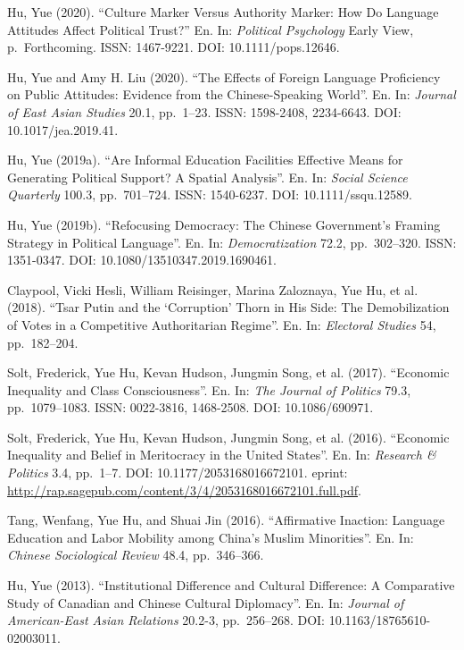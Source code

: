\documentclass[10.5pt,]{article}
\begin{document}
Hu, Yue (2020). ``Culture Marker Versus Authority Marker: How Do
Language Attitudes Affect Political Trust?'' En. In:
\emph{Political Psychology} Early View, p.~Forthcoming. ISSN: 1467-9221.
DOI: 10.1111/pops.12646.

Hu, Yue and Amy H. Liu (2020). ``The Effects of Foreign Language
Proficiency on Public Attitudes: Evidence from the Chinese-Speaking
World''. En. In: \emph{Journal of East Asian Studies} 20.1, pp.~1--23.
ISSN: 1598-2408, 2234-6643. DOI: 10.1017/jea.2019.41.

Hu, Yue (2019a). ``Are Informal Education Facilities Effective Means for
Generating Political Support? A Spatial Analysis''. En. In:
\emph{Social Science Quarterly} 100.3, pp.~701--724. ISSN: 1540-6237.
DOI: 10.1111/ssqu.12589.

Hu, Yue (2019b). ``Refocusing Democracy: The Chinese Government's
Framing Strategy in Political Language''. En. In: \emph{Democratization}
72.2, pp.~302--320. ISSN: 1351-0347. DOI: 10.1080/13510347.2019.1690461.

Claypool, Vicki Hesli, William Reisinger, Marina Zaloznaya, Yue Hu, et
al. (2018). ``Tsar Putin and the `Corruption' Thorn in His Side: The
Demobilization of Votes in a Competitive Authoritarian Regime''. En. In:
\emph{Electoral Studies} 54, pp.~182--204.

Solt, Frederick, Yue Hu, Kevan Hudson, Jungmin Song, et al. (2017).
``Economic Inequality and Class Consciousness''. En. In:
\emph{The Journal of Politics} 79.3, pp.~1079--1083. ISSN: 0022-3816,
1468-2508. DOI: 10.1086/690971.

Solt, Frederick, Yue Hu, Kevan Hudson, Jungmin Song, et al. (2016).
``Economic Inequality and Belief in Meritocracy in the United States''.
En. In: \emph{Research \& Politics} 3.4, pp.~1--7. DOI:
10.1177/2053168016672101. eprint:
\url{http://rap.sagepub.com/content/3/4/2053168016672101.full.pdf}.

Tang, Wenfang, Yue Hu, and Shuai Jin (2016). ``Affirmative Inaction:
Language Education and Labor Mobility among China's Muslim Minorities''.
En. In: \emph{Chinese Sociological Review} 48.4, pp.~346--366.

Hu, Yue (2013). ``Institutional Difference and Cultural Difference: A
Comparative Study of Canadian and Chinese Cultural Diplomacy''. En. In:
\emph{Journal of American-East Asian Relations} 20.2-3, pp.~256--268.
DOI: 10.1163/18765610-02003011.

\vspace{\baselineskip}
\end{document}
